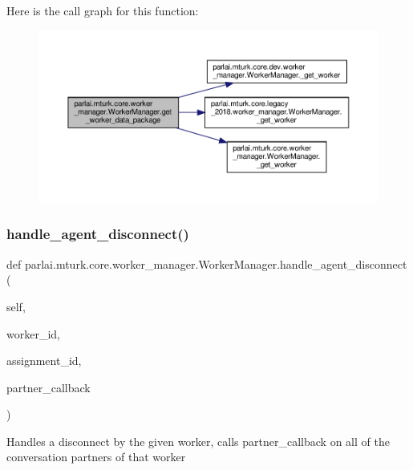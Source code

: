 Here is the call graph for this function\+:
\nopagebreak
\begin{figure}[H]
\begin{center}
\leavevmode
\includegraphics[width=350pt]{classparlai_1_1mturk_1_1core_1_1worker__manager_1_1WorkerManager_ae583d18246beaa4e75c2d1d539fe77ad_cgraph}
\end{center}
\end{figure}
\mbox{\label{classparlai_1_1mturk_1_1core_1_1worker__manager_1_1WorkerManager_a26f5469b17d425d52277f50b59e611f1}} 
\subsubsection{\texorpdfstring{handle\+\_\+agent\+\_\+disconnect()}{handle\_agent\_disconnect()}}
{\footnotesize\ttfamily def parlai.\+mturk.\+core.\+worker\+\_\+manager.\+Worker\+Manager.\+handle\+\_\+agent\+\_\+disconnect (\begin{DoxyParamCaption}\item[{}]{self,  }\item[{}]{worker\+\_\+id,  }\item[{}]{assignment\+\_\+id,  }\item[{}]{partner\+\_\+callback }\end{DoxyParamCaption})}

\begin{DoxyVerb}Handles a disconnect by the given worker, calls partner_callback
on all of the conversation partners of that worker
\end{DoxyVerb}
 

